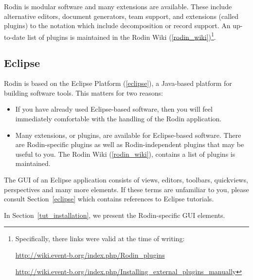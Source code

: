 Rodin is modular software and many extensions are available.  These include alternative editors, document generators, team support, and extensions (called plugins) to the notation which include decomposition or record support.  An up-to-date list of plugins is maintained in the Rodin Wiki (\ref{rodin_wiki})\footnote{Specifically, there links were valid at the time of writing:

\url{http://wiki.event-b.org/index.php/Rodin_plugins}

\url{http://wiki.event-b.org/index.php/Installing_external_plugins_manually}}.

\subsection{Eclipse} 
\label{tut_eclipse}

Rodin is based on the Eclipse Platform (\ref{eclipse}), a Java-based platform for building software tools.  This matters for two reasons:
\begin{itemize}
	\item If you have already used Eclipse-based software, then you will feel immediately comfortable with the handling of the Rodin application.
	\item Many extensions, or plugins, are available for Eclipse-based software. There are Rodin-specific plugins as well as Rodin-independent plugins that may be useful to you.  The Rodin Wiki (\ref{rodin_wiki}), contains a list of plugins is maintained.
\end{itemize}

The GUI of an Eclipse application consists of views, editors, toolbars, quickviews, perspectives and many more elements.  If these terms are unfamiliar to you, please consult Section~\ref{eclipse} which contains references to Eclipse tutorials.

In Section~\ref{tut_installation}, we present the Rodin-specific GUI elements.

